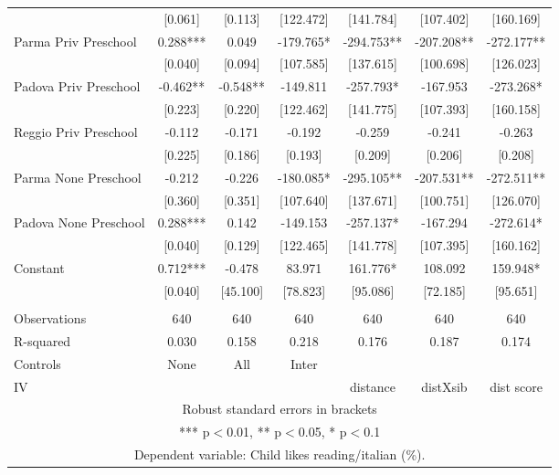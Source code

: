 \begin{tabular}{lcccccc}
 & [0.061] & [0.113] & [122.472] & [141.784] & [107.402] & [160.169] \\
Parma Priv Preschool & 0.288*** & 0.049 & -179.765* & -294.753** & -207.208** & -272.177** \\
 & [0.040] & [0.094] & [107.585] & [137.615] & [100.698] & [126.023] \\
Padova Priv Preschool & -0.462** & -0.548** & -149.811 & -257.793* & -167.953 & -273.268* \\
 & [0.223] & [0.220] & [122.462] & [141.775] & [107.393] & [160.158] \\
Reggio Priv Preschool & -0.112 & -0.171 & -0.192 & -0.259 & -0.241 & -0.263 \\
 & [0.225] & [0.186] & [0.193] & [0.209] & [0.206] & [0.208] \\
Parma None Preschool & -0.212 & -0.226 & -180.085* & -295.105** & -207.531** & -272.511** \\
 & [0.360] & [0.351] & [107.640] & [137.671] & [100.751] & [126.070] \\
Padova None Preschool & 0.288*** & 0.142 & -149.153 & -257.137* & -167.294 & -272.614* \\
 & [0.040] & [0.129] & [122.465] & [141.778] & [107.395] & [160.162] \\
Constant & 0.712*** & -0.478 & 83.971 & 161.776* & 108.092 & 159.948* \\
 & [0.040] & [45.100] & [78.823] & [95.086] & [72.185] & [95.651] \\
 &  &  &  &  &  &  \\
Observations & 640 & 640 & 640 & 640 & 640 & 640 \\
R-squared & 0.030 & 0.158 & 0.218 & 0.176 & 0.187 & 0.174 \\
Controls & None & All & Inter &  &  &  \\
 IV &  &  &  & distance & distXsib & dist score \\ \hline
\multicolumn{7}{c}{ Robust standard errors in brackets} \\
\multicolumn{7}{c}{ *** p$<$0.01, ** p$<$0.05, * p$<$0.1} \\
\multicolumn{7}{c}{ Dependent variable: Child likes reading/italian (\%).} \\
\end{tabular}
